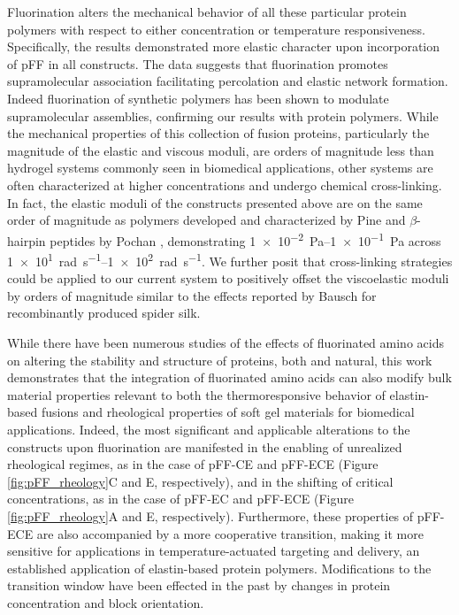\begin{refsection}
Fluorination alters the mechanical behavior of all these particular protein
polymers with respect to either concentration or temperature responsiveness.
Specifically, the results demonstrated more elastic character upon incorporation
of pFF in all constructs. The data suggests that fluorination promotes
supramolecular association facilitating percolation and elastic network
formation.\cite{Veerman2006,Safran1985,VanderLinden2001} Indeed fluorination of
synthetic polymers has been shown to modulate supramolecular assemblies,
confirming our results with protein
polymers.\cite{Percec2005,Krafft1993,Krafft1994,Krafft2001} While the mechanical
properties of this collection of fusion proteins, particularly the magnitude of
the elastic and viscous moduli, are orders of magnitude less than hydrogel
systems commonly seen in biomedical applications, other systems are often
characterized at higher concentrations and undergo chemical
cross-linking.\cite{Krishna2010,Yan2010a,Rammensee2008,Breedveld2004,Schneider2002}
In fact, the elastic moduli of the constructs presented above are on the same
order of magnitude as 
polymers developed and characterized by Pine  and
${\beta}$-hairpin peptides by Pochan , demonstrating
\SIrange[scientific-notation=true,retain-unity-mantissa=false]{1e-2}{1e-1}{\pascal}
across
\SIrange[scientific-notation=true,retain-unity-mantissa=false]{1e1}{1e2}{\radian\per\s}.
\cite{Breedveld2004,Yucel2008} We further posit that cross-linking strategies
could be applied to our current system to positively offset the viscoelastic
moduli by orders of magnitude similar to the effects reported by Bausch
 for recombinantly produced spider
silk.\cite{Rammensee2008,Breedveld2004,Yucel2008}

While there have been numerous studies of the effects of fluorinated amino acids
on altering the stability and structure of proteins, both  and
natural,\cite{Megeed2002,Meyer2002,Wright2002,Simnick2007,Baker2011,URRY1974,Urry1985}
this work demonstrates that the integration of fluorinated amino acids can also
modify bulk material properties relevant to both the thermoresponsive behavior
of elastin-based fusions and rheological properties of soft gel materials for
biomedical applications. Indeed, the most significant and applicable alterations
to the constructs upon fluorination are manifested in the enabling of unrealized
rheological regimes, as in the case of pFF-CE and pFF-ECE (Figure
\ref{fig:pFF_rheology}C and E, respectively), and in the shifting of critical
concentrations, as in the case of pFF-EC and pFF-ECE (Figure
\ref{fig:pFF_rheology}A and E, respectively). Furthermore, these properties of
pFF-ECE are also accompanied by a more cooperative transition, making it more
sensitive for applications in temperature-actuated targeting and delivery, an
established application of elastin-based protein
polymers.\cite{Simnick2007,Chilkoti2002a} Modifications to the transition window
have been effected in the past by changes in protein concentration and block
orientation.\cite{Yamaoka2003,Meyer2002}


\end{refsection}

